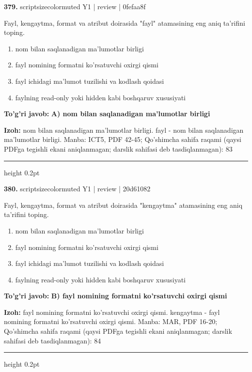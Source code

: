 \documentclass[10pt,a4paper]{article}
\begin{document}
{\bfseries\sffamily\color{ink} 379.} {scriptsizecolor{muted} Y1 | review | 0fefaa8f}
\par
Fayl, kengaytma, format va atribut doirasida "fayl" atamasining eng aniq ta'rifini toping.
\begin{enumerate}[label=\Alph*),leftmargin=9mm]
\item nom bilan saqlanadigan ma'lumotlar birligi
\item fayl nomining formatni ko'rsatuvchi oxirgi qismi
\item fayl ichidagi ma'lumot tuzilishi va kodlash qoidasi
\item faylning read-only yoki hidden kabi boshqaruv xususiyati
\end{enumerate}
\begin{tcolorbox}[enhanced,breakable,colback=teal!4,colframe=teal!60!black,boxrule=0.45pt,arc=1.2mm,left=2.7mm,right=2.7mm,top=1.8mm,bottom=1.8mm,before skip=2mm,after skip=2mm]
{\bfseries\sffamily\color{teal}To'g'ri javob:} \textbf{A) nom bilan saqlanadigan ma'lumotlar birligi}
\par\smallskip
{\bfseries Izoh:} nom bilan saqlanadigan ma'lumotlar birligi. fayl - nom bilan saqlanadigan ma'lumotlar birligi. Manba: ICT5, PDF 42-45; Qo'shimcha sahifa raqami (qaysi PDFga tegishli ekani aniqlanmagan; darslik sahifasi deb tasdiqlanmagan): 83
\end{tcolorbox}
\vspace{2mm}\hrule height 0.2pt\vspace{3mm}

{\bfseries\sffamily\color{ink} 380.} {scriptsizecolor{muted} Y1 | review | 20d61082}
\par
Fayl, kengaytma, format va atribut doirasida "kengaytma" atamasining eng aniq ta'rifini toping.
\begin{enumerate}[label=\Alph*),leftmargin=9mm]
\item nom bilan saqlanadigan ma'lumotlar birligi
\item fayl nomining formatni ko'rsatuvchi oxirgi qismi
\item fayl ichidagi ma'lumot tuzilishi va kodlash qoidasi
\item faylning read-only yoki hidden kabi boshqaruv xususiyati
\end{enumerate}
\begin{tcolorbox}[enhanced,breakable,colback=teal!4,colframe=teal!60!black,boxrule=0.45pt,arc=1.2mm,left=2.7mm,right=2.7mm,top=1.8mm,bottom=1.8mm,before skip=2mm,after skip=2mm]
{\bfseries\sffamily\color{teal}To'g'ri javob:} \textbf{B) fayl nomining formatni ko'rsatuvchi oxirgi qismi}
\par\smallskip
{\bfseries Izoh:} fayl nomining formatni ko'rsatuvchi oxirgi qismi. kengaytma - fayl nomining formatni ko'rsatuvchi oxirgi qismi. Manba: MAR, PDF 16-20; Qo'shimcha sahifa raqami (qaysi PDFga tegishli ekani aniqlanmagan; darslik sahifasi deb tasdiqlanmagan): 84
\end{tcolorbox}
\vspace{2mm}\hrule height 0.2pt\vspace{3mm}
\end{document}
